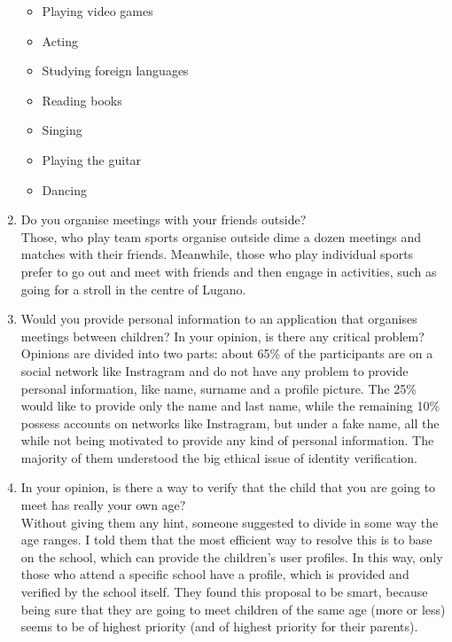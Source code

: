 \documentclass[12pt]{article}
\begin{document}
\begin{enumerate}
\begin{itemize}
    \item Playing video games
    \item Acting
    \item Studying foreign languages
    \item Reading books
    \item Singing
    \item Playing the guitar
    \item Dancing
  \end{itemize}
  \item Do you organise meetings with your friends outside? \\
  Those, who play team sports organise outside dime a dozen meetings and matches with their friends.
  Meanwhile, those who play individual sports prefer to go out and meet with friends and then engage in activities, such as going for a stroll in the centre of Lugano.
  \item Would you provide personal information to an application that organises meetings between children?
  In your opinion, is there any critical problem? \\
    Opinions are divided into two parts: about 65\% of the participants are on a social network like Instragram and do not have any problem to provide personal information, like name, surname and a profile picture. The 25\% would like to provide only the
    name and last name, while the remaining 10\% possess accounts on networks like Instragram, but under a fake name, all the while not being motivated to provide any kind of personal information. The majority of them understood the big ethical issue of identity verification.
  \item In your opinion, is there a way to verify that the child that you are going to meet has really your own age? \\
    Without giving them any hint, someone suggested to divide in some way the age ranges. I told them that the most efficient way to resolve this is to base on the school, which can provide the children's user profiles.
    In this way, only those who attend a specific school have a profile, which is provided and verified by the school itself. They found this proposal to be smart, because being sure that they are going to meet children of
    the same age (more or less) seems to be of highest priority (and of highest priority for their parents).


\end{enumerate}
\end{document}
